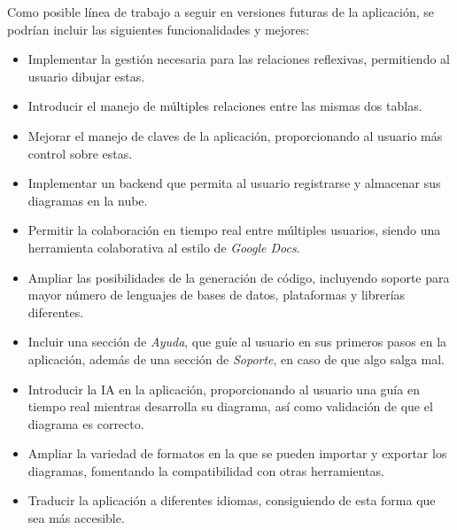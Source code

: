 Como posible línea de trabajo a seguir en versiones futuras de la aplicación, se podrían incluir las siguientes funcionalidades y mejores:
\begin{itemize}
    \item Implementar la gestión necesaria para las relaciones reflexivas, permitiendo al usuario dibujar estas.
    \item Introducir el manejo de múltiples relaciones entre las mismas dos tablas.
    \item Mejorar el manejo de claves de la aplicación, proporcionando al usuario más control sobre estas.
    \item Implementar un backend que permita al usuario registrarse y almacenar sus diagramas en la nube.
    \item Permitir la colaboración en tiempo real entre múltiples usuarios, siendo una herramienta colaborativa al estilo de \textit{Google Docs}.
    \item Ampliar las posibilidades de la generación de código, incluyendo soporte para mayor número de lenguajes de bases de datos, plataformas y librerías diferentes.
    \item Incluir una sección de \emph{Ayuda}, que guíe al usuario en sus primeros pasos en la aplicación, además de una sección de \emph{Soporte}, en caso de que algo salga mal.
    \item Introducir la IA en la aplicación, proporcionando al usuario una guía en tiempo real mientras desarrolla su diagrama, así como validación de que el diagrama es correcto.
    \item Ampliar la variedad de formatos en la que se pueden importar y exportar los diagramas, fomentando la compatibilidad con otras herramientas.
    \item Traducir la aplicación a diferentes idiomas, consiguiendo de esta forma que sea más accesible.
\end{itemize}